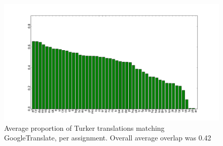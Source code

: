 \documentclass[11pt]{article}
\begin{document}

%
%



\begin{figure}[h]
\begin{center}
\includegraphics[width=1\linewidth]{final-figures/google-match}
\caption{Average proportion of Turker translations matching GoogleTranslate, per assignment. Overall average overlap was 0.42}
\label{googlematch} 
\end{center}
\end{figure}
\end{document}
